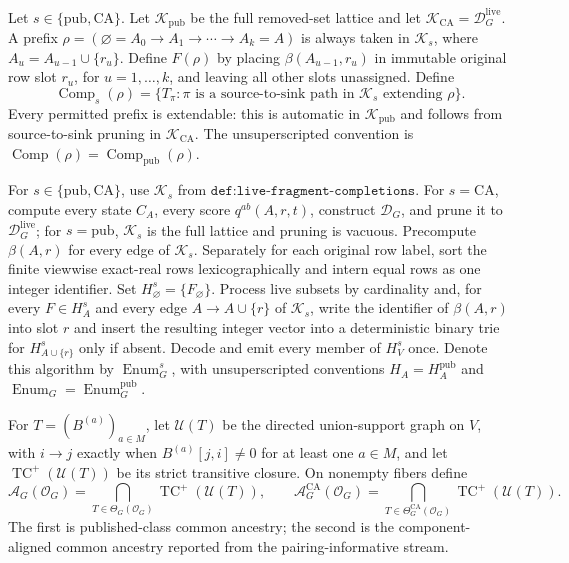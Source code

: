 Let \(s\in\{\mathrm{pub},\mathrm{CA}\}\).  Let \(\mathcal K_{\mathrm{pub}}\) be the full removed-set lattice and let \(\mathcal K_{\mathrm{CA}}=\mathcal D_G^{\mathrm{live}}\).  A prefix \(\rho=(\varnothing=A_0\to A_1\to\cdots\to A_k=A)\) is always taken in \(\mathcal K_s\), where \(A_u=A_{u-1}\cup\{r_u\}\).  Define \(F(\rho)\) by placing \(\beta(A_{u-1},r_u)\) in immutable original row slot \(r_u\), for \(u=1,\ldots,k\), and leaving all other slots unassigned.  Define
\[
 \operatorname{Comp}_s(\rho)=
 \{T_\pi:\pi\text{ is a source-to-sink path in }\mathcal K_s
 \text{ extending }\rho\}.
\]
Every permitted prefix is extendable: this is automatic in \(\mathcal K_{\mathrm{pub}}\) and follows from source-to-sink pruning in \(\mathcal K_{\mathrm{CA}}\).  The unsuperscripted convention is \(\operatorname{Comp}(\rho)=\operatorname{Comp}_{\mathrm{pub}}(\rho)\).

For \(s\in\{\mathrm{pub},\mathrm{CA}\}\), use \(\mathcal K_s\) from \(\texttt{def:live-fragment-completions}\).  For \(s=\mathrm{CA}\), compute every state \(C_A\), every score \(q^{ab}(A,r,t)\), construct \(\mathcal D_G\), and prune it to \(\mathcal D_G^{\mathrm{live}}\); for \(s=\mathrm{pub}\), \(\mathcal K_s\) is the full lattice and pruning is vacuous.  Precompute \(\beta(A,r)\) for every edge of \(\mathcal K_s\).  Separately for each original row label, sort the finite viewwise exact-real rows lexicographically and intern equal rows as one integer identifier.  Set \(H_{\varnothing}^s=\{F_{\varnothing}\}\).  Process live subsets by cardinality and, for every \(F\in H_A^s\) and every edge \(A\to A\cup\{r\}\) of \(\mathcal K_s\), write the identifier of \(\beta(A,r)\) into slot \(r\) and insert the resulting integer vector into a deterministic binary trie for \(H_{A\cup\{r\}}^s\) only if absent.  Decode and emit every member of \(H_V^s\) once.  Denote this algorithm by \(\operatorname{Enum}_G^s\), with unsuperscripted conventions \(H_A=H_A^{\mathrm{pub}}\) and \(\operatorname{Enum}_G=\operatorname{Enum}_G^{\mathrm{pub}}\).

For \(T=(B^{(a)})_{a\in M}\), let \(\mathcal U(T)\) be the directed union-support graph on \(V\), with \(i\to j\) exactly when \(B^{(a)}[j,i]\ne0\) for at least one \(a\in M\), and let \(\operatorname{TC}^{+}(\mathcal U(T))\) be its strict transitive closure.  On nonempty fibers define
\[
 \mathcal A_G(\mathcal O_G)=
 \bigcap_{T\in\Theta_G(\mathcal O_G)}
 \operatorname{TC}^{+}(\mathcal U(T)),
 \qquad
 \mathcal A_G^{\mathrm{CA}}(\mathcal O_G)=
 \bigcap_{T\in\Theta_G^{\mathrm{CA}}(\mathcal O_G)}
 \operatorname{TC}^{+}(\mathcal U(T)).
\]
The first is published-class common ancestry; the second is the component-aligned common ancestry reported from the pairing-informative stream.

